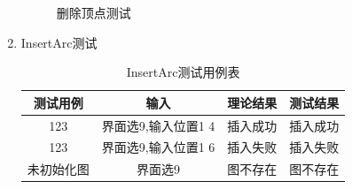 \documentclass[supercite]{HustGraduPaper}
\theoremstyle{definition}
\begin{document}
\begin{enumerate}
\begin{figure}[htb]
		      \caption{删除顶点测试}
	      \end{figure}
	      \newpage
	\item InsertArc测试
	      \begin{table}[htb]
		      \begin{center}
			      \setlength{\tabcolsep}{2.0mm}
			      \caption{InsertArc测试用例表}
			      \label{t9}
			      \begin{tabular}{|c|c|c|c|}
				      \hline
				      测试用例   & 输入                & 理论结果 & 测试结果 \\
				      \hline
				      \hline
				      123        & 界面选9,输入位置1 4 & 插入成功 & 插入成功 \\
				      \hline
				      123        & 界面选9,输入位置1 6 & 插入失败 & 插入失败 \\
				      \hline
				      未初始化图 & 界面选9             & 图不存在 & 图不存在 \\
				      \hline
			      \end{tabular}
		      \end{center}
	      \end{table}
	      \begin{figure}[htb]
		      \centering
		      \quad
		      \quad
		      \\

\end{figure}
\end{enumerate}
\end{document}

